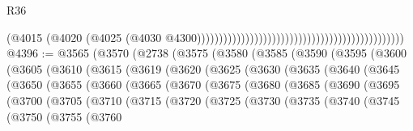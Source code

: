 \begin{lexlean}{R36}
\begin{coremodule}
                                                                                          (@4015
                                                                                            (@4020
                                                                                              (@4025
                                                                                                (@4030
                                                                                                  @4300)))))))))))))))))))))))))))))))))))))))))))))))
@4396 := @3565
    (@3570
      (@2738
        (@3575
          (@3580
            (@3585
              (@3590
                (@3595
                  (@3600
                    (@3605
                      (@3610
                        (@3615
                          (@3619
                            (@3620
                              (@3625
                                (@3630
                                  (@3635
                                    (@3640
                                      (@3645
                                        (@3650
                                          (@3655
                                            (@3660
                                              (@3665
                                                (@3670
                                                  (@3675
                                                    (@3680
                                                      (@3685
                                                        (@3690
                                                          (@3695
                                                            (@3700
                                                              (@3705
                                                                (@3710
                                                                  (@3715
                                                                    (@3720
                                                                      (@3725
                                                                        (@3730
                                                                          (@3735
                                                                            (@3740
                                                                              (@3745
                                                                                (@3750
                                                                                  (@3755
                                                                                    (@3760

\end{coremodule}
\end{lexlean}
